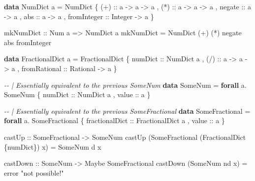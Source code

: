 \documentclass[]{article}
\newenvironment{Shaded}{}{}
\newcommand{\CommentTok}[1]{\textcolor[rgb]{0.38,0.63,0.69}{\textit{#1}}}
\newcommand{\DataTypeTok}[1]{\textcolor[rgb]{0.56,0.13,0.00}{#1}}
\newcommand{\FunctionTok}[1]{\textcolor[rgb]{0.02,0.16,0.49}{#1}}
\newcommand{\KeywordTok}[1]{\textcolor[rgb]{0.00,0.44,0.13}{\textbf{#1}}}
\newcommand{\NormalTok}[1]{#1}
\newcommand{\OperatorTok}[1]{\textcolor[rgb]{0.40,0.40,0.40}{#1}}
\newcommand{\OtherTok}[1]{\textcolor[rgb]{0.00,0.44,0.13}{#1}}
\newcommand{\StringTok}[1]{\textcolor[rgb]{0.25,0.44,0.63}{#1}}
\begin{document}
\begin{Shaded}
\begin{Highlighting}[]
\KeywordTok{data} \DataTypeTok{NumDict}\NormalTok{ a }\OtherTok{=} \DataTypeTok{NumDict}
\NormalTok{    \{}\OtherTok{ (+) ::}\NormalTok{ a }\OtherTok{{-}\textgreater{}}\NormalTok{ a }\OtherTok{{-}\textgreater{}}\NormalTok{ a}
\NormalTok{    ,}\OtherTok{ (*) ::}\NormalTok{ a }\OtherTok{{-}\textgreater{}}\NormalTok{ a }\OtherTok{{-}\textgreater{}}\NormalTok{ a}
\NormalTok{    ,}\OtherTok{ negate ::}\NormalTok{ a }\OtherTok{{-}\textgreater{}}\NormalTok{ a}
\NormalTok{    ,}\OtherTok{ abs ::}\NormalTok{ a }\OtherTok{{-}\textgreater{}}\NormalTok{ a}
\NormalTok{    ,}\OtherTok{ fromInteger ::} \DataTypeTok{Integer} \OtherTok{{-}\textgreater{}}\NormalTok{ a}
\NormalTok{    \}}

\OtherTok{mkNumDict ::} \DataTypeTok{Num}\NormalTok{ a }\OtherTok{=\textgreater{}} \DataTypeTok{NumDict}\NormalTok{ a}
\NormalTok{mkNumDict }\OtherTok{=} \DataTypeTok{NumDict}\NormalTok{ (}\OperatorTok{+}\NormalTok{) (}\OperatorTok{*}\NormalTok{) }\FunctionTok{negate} \FunctionTok{abs} \FunctionTok{fromInteger}

\KeywordTok{data} \DataTypeTok{FractionalDict}\NormalTok{ a }\OtherTok{=} \DataTypeTok{FractionalDict}
\NormalTok{    \{}\OtherTok{ numDict ::} \DataTypeTok{NumDict}\NormalTok{ a}
\NormalTok{    ,}\OtherTok{ (/) ::}\NormalTok{ a }\OtherTok{{-}\textgreater{}}\NormalTok{ a }\OtherTok{{-}\textgreater{}}\NormalTok{ a}
\NormalTok{    ,}\OtherTok{ fromRational ::} \DataTypeTok{Rational} \OtherTok{{-}\textgreater{}}\NormalTok{ a}
\NormalTok{    \}}

\CommentTok{{-}{-} | Essentially equivalent to the previous \textquotesingle{}SomeNum\textquotesingle{}}
\KeywordTok{data} \DataTypeTok{SomeNum} \OtherTok{=} \KeywordTok{forall}\NormalTok{ a}\OperatorTok{.} \DataTypeTok{SomeNum}
\NormalTok{    \{}\OtherTok{ numDict ::} \DataTypeTok{NumDict}\NormalTok{ a}
\NormalTok{    ,}\OtherTok{ value ::}\NormalTok{ a}
\NormalTok{    \}}

\CommentTok{{-}{-} | Essentially equivalent to the previous \textquotesingle{}SomeFractional\textquotesingle{}}
\KeywordTok{data} \DataTypeTok{SomeFractional} \OtherTok{=} \KeywordTok{forall}\NormalTok{ a}\OperatorTok{.} \DataTypeTok{SomeFractional}
\NormalTok{    \{}\OtherTok{ fractionalDict ::} \DataTypeTok{FractionalDict}\NormalTok{ a}
\NormalTok{    ,}\OtherTok{ value ::}\NormalTok{ a}
\NormalTok{    \}}

\OtherTok{castUp ::} \DataTypeTok{SomeFractional} \OtherTok{{-}\textgreater{}} \DataTypeTok{SomeNum}
\NormalTok{castUp (}\DataTypeTok{SomeFractional}\NormalTok{ (}\DataTypeTok{FractionalDict}\NormalTok{ \{numDict\}) x) }\OtherTok{=} \DataTypeTok{SomeNum}\NormalTok{ d x}

\OtherTok{castDown ::} \DataTypeTok{SomeNum} \OtherTok{{-}\textgreater{}} \DataTypeTok{Maybe} \DataTypeTok{SomeFractional}
\NormalTok{castDown (}\DataTypeTok{SomeNum}\NormalTok{ nd x) }\OtherTok{=} \FunctionTok{error} \StringTok{"not possible!"}
\end{Highlighting}
\end{Shaded}
\end{document}
